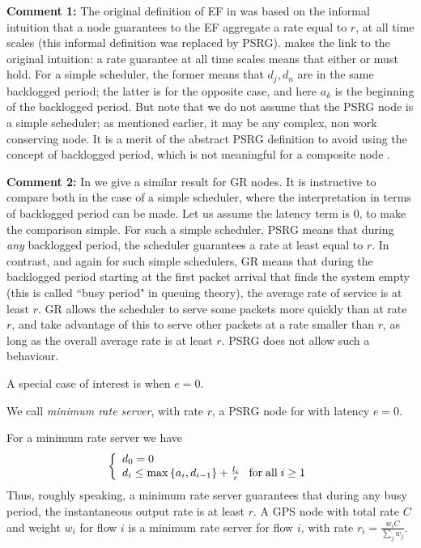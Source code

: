 \textbf{Comment 1: }The original definition of EF in
\cite{RFC2598} was based on the informal intuition that a node
guarantees to the EF aggregate a rate equal to $r$, at all
time scales (this informal definition was replaced by PSRG).
 makes the link to the original
intuition: a rate guarantee at all time scales means that
either  or  must
hold. For a simple scheduler, the former means that $d_j, d_n$
are in the same backlogged period; the latter is for the
opposite case, and here $a_k$ is the beginning of the
backlogged period. But note that we do not assume that the
PSRG node is a simple scheduler; as mentioned earlier, it may
be any complex, non work conserving node. It is a merit of the
abstract PSRG definition to avoid using the concept of
backlogged period, which is not meaningful for a composite
node \cite{efsup-rfc,psrgton}.

\textbf{Comment 2: }In  we give a
similar result for GR nodes. It is instructive to compare both
in the case of a simple scheduler, where the interpretation in
terms of backlogged period can be made.  Let us assume the
latency term is $0$, to make the comparison simple. For such a
simple scheduler,  PSRG means that during \emph{any}
backlogged period, the scheduler guarantees a rate at least
equal to $r$. In contrast, and again for such simple
schedulers, GR means that during the backlogged period
starting at the first packet arrival that finds the system
empty (this is called ``busy period" in queuing theory), the
average rate of service is at least $r$. GR allows the
scheduler to serve some packets more quickly than at rate $r$,
and take advantage of this to serve other packets at a rate
smaller than $r$, as long as the overall average rate is at
least $r$. PSRG does not allow such a behaviour.

A special case of interest is when $e=0$.

\begin{definition}
We call \emph{minimum rate server}, with rate $r$, a PSRG node
for with latency $e=0$.
\end{definition}
For a minimum rate server we have
\begin{equation}\mylabel{eq-mr-def}
\bracket{ d_0=0\\
    d_i \leq \max \left\{
                   a_i, d_{i-1}
                 \right\}
             + \frac{l_i}{r} \gap \mfa i \geq 1
            }
\end{equation}
Thus, roughly speaking, a
minimum rate server guarantees that during any busy period,
the instantaneous output rate is at least $r$. A GPS node with
total rate $C$ and weight $w_i$ for flow $i$ is a minimum rate
server for flow $i$, with rate $r_i=\frac{w_i C }{\sum_j
w_j}$.



